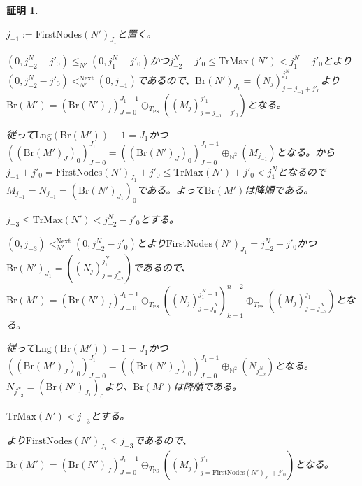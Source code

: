 \documentclass[dvipdfmx,uplatex]{jsarticle}
\theoremstyle{customnonumberbreakfortheorem}
\theoremstyle{customnonumberbreakforproof}
\newtheorem{hideableproof}{証明}
\begin{document}
\begin{hideableproof}
\begin{indented}
\begin{indented}
\begin{indented}
\begin{indented}
\begin{indented}
\begin{indented}
							\begin{indented}
								\item \(j_{-1} := \textrm{FirstNodes}(N')_{J_1}\)と置く。
								\item \((0,j_{-2}^N-j'_0) \leq_{N'} (0,j_1^N-j'_0)\)かつ\(j_{-2}^N-j'_0 \leq \textrm{TrMax}(N') < j_1^N-j'_0\)とより\((0,j_{-2}^N-j'_0) <_{N'}^{\textrm{Next}} (0,j_{-1})\)であるので、\(\textrm{Br}(N')_{J_1} = (N_j)_{j=j_{-1}+j'_0}^{j_1^N}\)より\(\textrm{Br}(M') = (\textrm{Br}(N')_J)_{J=0}^{J_1-1} \oplus_{T_{\textrm{PS}}} ((M_j)_{j=j_{-1}+j'_0}^{j'_1})\)となる。
								\item 従って\(\textrm{Lng}(\textrm{Br}(M'))-1 = J_1\)かつ\(((\textrm{Br}(M')_J)_0)_{J=0}^{J_1} = ((\textrm{Br}(N')_J)_0)_{J=0}^{J_1-1} \oplus_{\mathbb{N}^2} (M_{j_{-1}})\)となる。から\(j_{-1}+j'_0 = \textrm{FirstNodes}(N')_{J_1}+j'_0 \leq \textrm{TrMax}(N')+j'_0 < j_1^N\)となるので\(M_{j_{-1}} = N_{j_{-1}} = (\textrm{Br}(N')_{J_1})_0\)である。よって\(\textrm{Br}(M')\)は降順である。
							\end{indented}
							\item
							\item \(j_{-3} \leq \textrm{TrMax}(N') < j_{-2}^N-j'_0\)とする。
							\begin{indented}
								\item \((0,j_{-3}) <_{N'}^{\textrm{Next}} (0,j_{-2}^N-j'_0)\)とより\(\textrm{FirstNodes}(N')_{J_1} = j_{-2}^N-j'_0\)かつ\(\textrm{Br}(N')_{J_1} = ((N_j)_{j=j_{-2}^N}^{j_1^N})\)であるので、\(\textrm{Br}(M') = (\textrm{Br}(N')_J)_{J=0}^{J_1-1} \oplus_{T_{\textrm{PS}}} ((N_j)_{j=j_0^N}^{j_1^N-1})_{k=1}^{n-2} \oplus_{T_{\textrm{PS}}} ((M_j)_{j=j_{-2}^N}^{j_1})\)となる。
								\item 従って\(\textrm{Lng}(\textrm{Br}(M'))-1 = J_1\)かつ\(((\textrm{Br}(M')_J)_0)_{J=0}^{J_1} = ((\textrm{Br}(N')_J)_0)_{J=0}^{J_1-1} \oplus_{\mathbb{N}^2} (N_{j_{-2}^N})\)となる。\(N_{j_{-2}^N} = (\textrm{Br}(N')_{J_1})_0\)より、\(\textrm{Br}(M')\)は降順である。
							\end{indented}
							\item
							\item \(\textrm{TrMax}(N') < j_{-3}\)とする。
							\begin{indented}
								\item {}より\(\textrm{FirstNodes}(N')_{J_1} \leq j_{-3}\)であるので、\(\textrm{Br}(M') = (\textrm{Br}(N')_J)_{J=0}^{J_1-1} \oplus_{T_{\textrm{PS}}} ((M_j)_{j = \textrm{FirstNodes}(N')_{J_1}+j'_0}^{j'_1})\)となる。

\end{indented}
\end{indented}
\end{indented}
\end{indented}
\end{indented}
\end{indented}
\end{indented}
\end{hideableproof}
\end{document}
